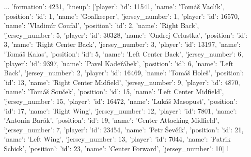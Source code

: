                                                                                                                                                                                                                                                                                                                                                                                                                                                                                                                                                                                                                                                                                                                                                                                                                                                                                                                                                                                                                                                                                                                                                                                                                                                                                                                                                                                                                                                                                                                     ...   
{'formation': 4231, 'lineup': [{'player': {'id': 11541, 'name': 'Tomáš Vaclík'}, 'position': {'id': 1, 'name': 'Goalkeeper'}, 'jersey_number': 1}, {'player': {'id': 16570, 'name': 'Vladimír Coufal'}, 'position': {'id': 2, 'name': 'Right Back'}, 'jersey_number': 5}, {'player': {'id': 30328, 'name': 'Ondrej Celustka'}, 'position': {'id': 3, 'name': 'Right Center Back'}, 'jersey_number': 3}, {'player': {'id': 13197, 'name': 'Tomáš Kalas'}, 'position': {'id': 5, 'name': 'Left Center Back'}, 'jersey_number': 6}, {'player': {'id': 9397, 'name': 'Pavel Kadeřábek'}, 'position': {'id': 6, 'name': 'Left Back'}, 'jersey_number': 2}, {'player': {'id': 16469, 'name': 'Tomáš Holeš'}, 'position': {'id': 13, 'name': 'Right Center Midfield'}, 'jersey_number': 9}, {'player': {'id': 4870, 'name': 'Tomáš Souček'}, 'position': {'id': 15, 'name': 'Left Center Midfield'}, 'jersey_number': 15}, {'player': {'id': 16472, 'name': 'Lukáš Masopust'}, 'position': {'id': 17, 'name': 'Right Wing'}, 'jersey_number': 12}, {'player': {'id': 7801, 'name': 'Antonín Barák'}, 'position': {'id': 19, 'name': 'Center Attacking Midfield'}, 'jersey_number': 7}, {'player': {'id': 23454, 'name': 'Petr Ševčík'}, 'position': {'id': 21, 'name': 'Left Wing'}, 'jersey_number': 13}, {'player': {'id': 7044, 'name': 'Patrik Schick'}, 'position': {'id': 23, 'name': 'Center Forward'}, 'jersey_number': 10}]}                                                                                           1
